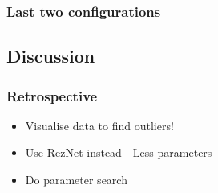 \documentclass{beamer}
\begin{document}
\begin{frame}
  \frametitle{Last two configurations}
  

\end{frame}






\subsection{Discussion}
\begin{frame}
  \frametitle{Retrospective}
  \begin{itemize}
    \item Visualise data to find outliers!
    \item Use RezNet instead - Less parameters
    \item Do parameter search
  \end{itemize}
\end{frame}
\end{document}
